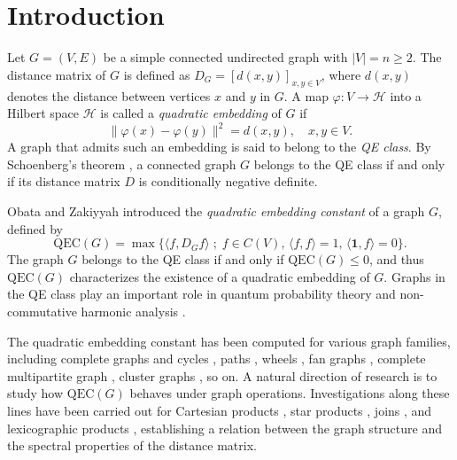 \documentclass[pdflatex,sn-mathphys-num]{sn-jnl}
\theoremstyle{thmstyleone}%
\theoremstyle{thmstyletwo}%
\theoremstyle{thmstylethree}%
\begin{document}


\maketitle


\section{Introduction}

Let $G=(V,E)$ be a simple connected undirected graph with $|V|=n\ge 2$. 
The distance matrix of $G$ is defined as $D_G=[d(x,y)]_{x,y\in V}$, where 
$d(x,y)$ denotes the distance between vertices $x$ and $y$ in $G$. A map 
$\varphi:V\to\mathcal{H}$ into a Hilbert space $\mathcal{H}$ is called a 
\emph{quadratic embedding} of $G$ if
\[
\|\varphi(x)-\varphi(y)\|^2 = d(x,y), \quad x,y\in V.
\]
A graph that admits such an embedding is said to belong to the \emph{QE class}. 
By Schoenberg's theorem \cite{Schoenberg1935,Schoenberg1937}, a connected graph 
$G$ belongs to the QE class if and only if its distance matrix $D$ is conditionally 
negative definite.

Obata and Zakiyyah \cite{Obata-Zakiyyah2018} introduced the
\emph{quadratic embedding constant} of a graph $G$, defined by
\[
\mathrm{QEC}(G)
=
\max
\bigl\{
\langle f,D_G f\rangle
\; ; \;
f\in C(V),\,
\langle f,f\rangle=1,\,
\langle \mathbf{1},f\rangle=0
\bigr\}.
\]
The graph $G$ belongs to the QE class if and only if $\mathrm{QEC}(G)\le0$,
and thus $\mathrm{QEC}(G)$ characterizes the existence of a quadratic
embedding of $G$. Graphs in the QE class play an important role in quantum probability theory 
and non-commutative harmonic analysis \cite{Haagerup1979, Hora-Obata2007, Obata2007, Schoenberg1938}.

The quadratic embedding constant has been computed for various graph families, 
including complete graphs and cycles \cite{Obata-Zakiyyah2018}, paths 
\cite{Mlotkowski2022}, wheels \cite{Obata2017}, fan graphs 
\cite{Mlotkowski-Obata2025a,Mlotkowski-Obata2025b}, complete multipartite graph \cite{Obata2023}, cluster graphs 
\cite{Choudhury-Nandi2023}, so on. A natural direction of research is to study how 
$\mathrm{QEC}(G)$ behaves under graph operations. Investigations along these lines 
have been carried out for Cartesian products \cite{Obata-Zakiyyah2018,Choudhury-Nandi2025}, star products 
\cite{Baskoro-Obata2021,Mlotkowski-Obata2020}, joins 
\cite{Lou-Obata-Huang2022,Mlotkowski-Obata2025a,Choudhury-Nandi2025}, and lexicographic products 
\cite{Lou-Obata-Huang2022}, establishing a relation between the graph structure and the spectral properties of the distance matrix.
\end{document}

